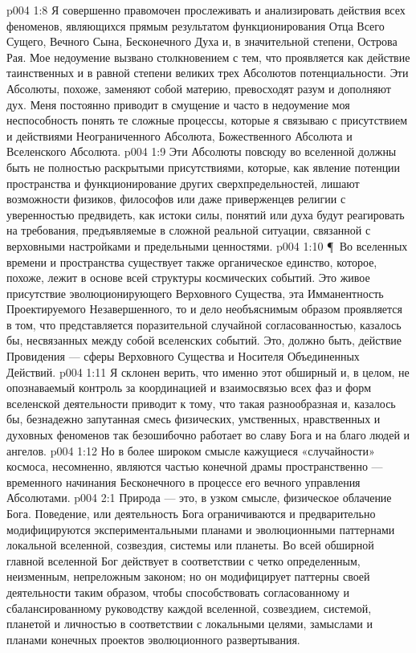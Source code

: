 \vs p004 1:8 Я совершенно правомочен прослеживать и анализировать действия всех феноменов, являющихся прямым результатом функционирования Отца Всего Сущего, Вечного Сына, Бесконечного Духа и, в значительной степени, Острова Рая. Мое недоумение вызвано столкновением с тем, что проявляется как действие таинственных и в равной степени великих трех Абсолютов потенциальности. Эти Абсолюты, похоже, заменяют собой материю, превосходят разум и дополняют дух. Меня постоянно приводит в смущение и часто в недоумение моя неспособность понять те сложные процессы, которые я связываю с присутствием и действиями Неограниченного Абсолюта, Божественного Абсолюта и Вселенского Абсолюта.
\vs p004 1:9 Эти Абсолюты повсюду во вселенной должны быть не полностью раскрытыми присутствиями, которые, как явление потенции пространства и функционирование других сверхпредельностей, лишают возможности физиков, философов или даже приверженцев религии с уверенностью предвидеть, как истоки силы, понятий или духа будут реагировать на требования, предъявляемые в сложной реальной ситуации, связанной с верховными настройками и предельными ценностями.
\vs p004 1:10 \P\ Во вселенных времени и пространства существует также органическое единство, которое, похоже, лежит в основе всей структуры космических событий. Это живое присутствие эволюционирующего Верховного Существа, эта Имманентность Проектируемого Незавершенного, то и дело необъяснимым образом проявляется в том, что представляется поразительной случайной согласованностью, казалось бы, несвязанных между собой вселенских событий. Это, должно быть, действие Провидения --- сферы Верховного Существа и Носителя Объединенных Действий.
\vs p004 1:11 Я склонен верить, что именно этот обширный и, в целом, не опознаваемый контроль за координацией и взаимосвязью всех фаз и форм вселенской деятельности приводит к тому, что такая разнообразная и, казалось бы, безнадежно запутанная смесь физических, умственных, нравственных и духовных феноменов так безошибочно работает во славу Бога и на благо людей и ангелов.
\vs p004 1:12 Но в более широком смысле кажущиеся «случайности» космоса, несомненно, являются частью конечной драмы пространственно --- временного начинания Бесконечного в процессе его вечного управления Абсолютами.
\vs p004 2:1 Природа --- это, в узком смысле, физическое облачение Бога. Поведение, или деятельность Бога ограничиваются и предварительно модифицируются экспериментальными планами и эволюционными паттернами локальной вселенной, созвездия, системы или планеты. Во всей обширной главной вселенной Бог действует в соответствии с четко определенным, неизменным, непреложным законом; но он модифицирует паттерны своей деятельности таким образом, чтобы способствовать согласованному и сбалансированному руководству каждой вселенной, созвездием, системой, планетой и личностью в соответствии с локальными целями, замыслами и планами конечных проектов эволюционного развертывания.
